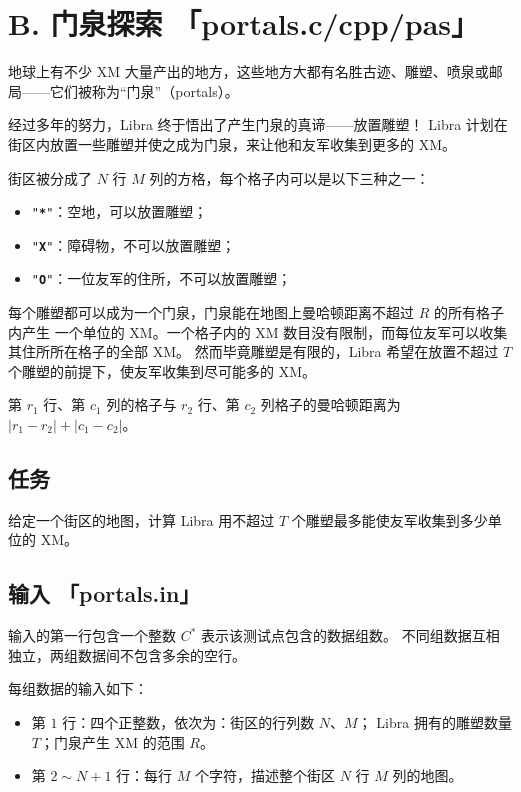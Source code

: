 \documentclass[UTF8, 11pt, a4paper]{article}
\begin{document}

\section*{B. \makebox[1em]{} 门泉探索 \makebox[2.5em]{} \small{「portals.c/cpp/pas」}}
地球上有不少 XM 大量产出的地方，这些地方大都有名胜古迹、雕塑、喷泉或邮局——它们被称为“门泉”（portals）。

经过多年的努力，Libra 终于悟出了产生门泉的真谛——放置雕塑！%
Libra 计划在街区内放置一些雕塑并使之成为门泉，来让他和友军收集到更多的 XM。

街区被分成了 $N$ 行 $M$ 列的方格，每个格子内可以是以下三种之一：
\begin{itemize}
    \item \texttt{"\textbf{*}"}：空地，可以放置雕塑；
    \item \texttt{"\textbf{X}"}：障碍物，不可以放置雕塑；
    \item \texttt{"\textbf{O}"}：一位友军的住所，不可以放置雕塑；
\end{itemize}

每个雕塑都可以成为一个门泉，门泉能在地图上曼哈顿距离不超过 $R$ 的所有格子内产生%
一个单位的 XM。一个格子内的 XM 数目没有限制，而每位友军可以收集其住所所在格子的全部 XM。%
然而毕竟雕塑是有限的，Libra 希望在放置不超过 $T$ 个雕塑的前提下，使友军收集到尽可能多的 XM。

第 $r_1$ 行、第 $c_1$ 列的格子与 $r_2$ 行、第 $c_2$ 列格子的曼哈顿距离为%
$|r_1 - r_2| + |c_1 - c_2|$。

\subsection*{任务}
给定一个街区的地图，计算 Libra 用不超过 $T$ 个雕塑最多能使友军收集到多少单位的 XM。

\subsection*{输入 \makebox[0.5em]{} \small{「portals.in」}}
输入的第一行包含一个整数 $C^*$ 表示该测试点包含的数据组数。%
不同组数据互相独立，两组数据间不包含多余的空行。

每组数据的输入如下：
\begin{itemize}
    \item 第 $1$ 行：四个正整数，依次为：街区的行列数 $N$、$M$；
        Libra 拥有的雕塑数量 $T$；门泉产生 XM 的范围 $R$。
    \item 第 $2 \sim N+1$ 行：每行 $M$ 个字符，描述整个街区 $N$ 行 $M$ 列的地图。
\end{itemize}
\end{document}
